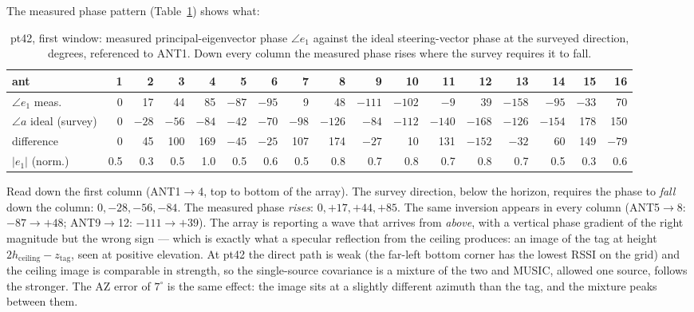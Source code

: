 \documentclass[11pt,a4paper]{article}
\begin{document}
The measured phase pattern (Table~\ref{tab:pt42_e1}) shows what:

\begin{table}[htbp]\centering\footnotesize\setlength{\tabcolsep}{3pt}
\begin{tabular}{l*{16}{r}}
\toprule
ant & 1 & 2 & 3 & 4 & 5 & 6 & 7 & 8 & 9 & 10 & 11 & 12 & 13 & 14 & 15 & 16 \\
\midrule
$\angle e_1$ meas. & 0 & 17 & 44 & 85 & $-87$ & $-95$ & 9 & 48 & $-111$ & $-102$ & $-9$ & 39 & $-158$ & $-95$ & $-33$ & 70 \\
$\angle a$ ideal (survey) & 0 & $-28$ & $-56$ & $-84$ & $-42$ & $-70$ & $-98$ & $-126$ & $-84$ & $-112$ & $-140$ & $-168$ & $-126$ & $-154$ & 178 & 150 \\
difference & 0 & 45 & 100 & 169 & $-45$ & $-25$ & 107 & 174 & $-27$ & 10 & 131 & $-152$ & $-32$ & 60 & 149 & $-79$ \\
$|e_1|$ (norm.) & 0.5 & 0.3 & 0.5 & 1.0 & 0.5 & 0.6 & 0.5 & 0.8 & 0.7 & 0.8 & 0.7 & 0.8 & 0.7 & 0.5 & 0.3 & 0.6 \\
\bottomrule
\end{tabular}
\caption{pt42, first window: measured principal-eigenvector phase $\angle e_1$ against the ideal steering-vector phase at the surveyed direction, degrees, referenced to ANT1. Down every column the measured phase rises where the survey requires it to fall.}\label{tab:pt42_e1}
\end{table}

Read down the first column (ANT1$\to$4, top to bottom of the array). The survey direction, below the horizon, requires the phase to \emph{fall} down the column: $0, -28, -56, -84$. The measured phase \emph{rises}: $0, +17, +44, +85$. The same inversion appears in every column (ANT5$\to$8: $-87 \to +48$; ANT9$\to$12: $-111 \to +39$). The array is reporting a wave that arrives from \emph{above}, with a vertical phase gradient of the right magnitude but the wrong sign --- which is exactly what a specular reflection from the ceiling produces: an image of the tag at height $2h_\text{ceiling} - z_\text{tag}$, seen at positive elevation. At pt42 the direct path is weak (the far-left bottom corner has the lowest RSSI on the grid) and the ceiling image is comparable in strength, so the single-source covariance is a mixture of the two and MUSIC, allowed one source, follows the stronger. The AZ error of $7^\circ$ is the same effect: the image sits at a slightly different azimuth than the tag, and the mixture peaks between them.
\end{document}
